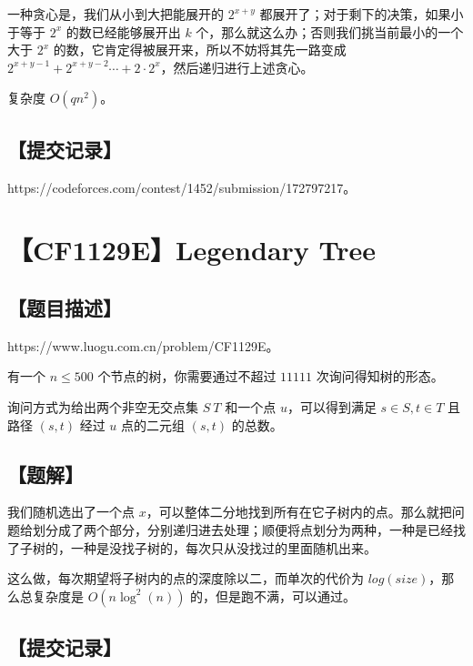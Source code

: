 \documentclass[UTF8,12pt,a4paper]{ctexart}
\begin{document}
	一种贪心是，我们从小到大把能展开的 $2^{x+y}$ 都展开了；对于剩下的决策，如果小于等于 $2^x$ 的数已经能够展开出 $k$ 个，那么就这么办；否则我们挑当前最小的一个大于 $2^x$ 的数，它肯定得被展开来，所以不妨将其先一路变成 $2^{x+y-1}+2^{x+y-2}\cdots +2\cdot 2^x$，然后递归进行上述贪心。
	
	复杂度 $O(qn^2)$。
	
	\subsection*{【提交记录】}
	
	https://codeforces.com/contest/1452/submission/172797217。
	
	
	\section*{【CF1129E】Legendary Tree}
	
	\subsection*{【题目描述】}
	
	https://www.luogu.com.cn/problem/CF1129E。
	
	有一个 $n\le 500$ 个节点的树，你需要通过不超过 $11111$ 次询问得知树的形态。
	
	询问方式为给出两个非空无交点集 $S\ T$ 和一个点 $u$，可以得到满足 $s \in S , t \in T$ 且路径 $(s,t)$ 经过 $u$ 点的二元组 $(s,t)$ 的总数。
	
	\subsection*{【题解】}
	
	我们随机选出了一个点 $x$，可以整体二分地找到所有在它子树内的点。那么就把问题给划分成了两个部分，分别递归进去处理；顺便将点划分为两种，一种是已经找了子树的，一种是没找子树的，每次只从没找过的里面随机出来。
	
	这么做，每次期望将子树内的点的深度除以二，而单次的代价为 $log(size)$，那么总复杂度是 $O(n\log^2(n))$ 的，但是跑不满，可以通过。
	
	\subsection*{【提交记录】}
	
\end{document}

